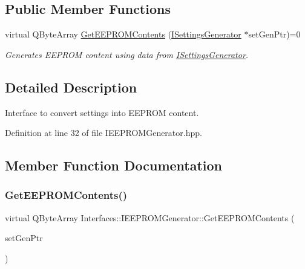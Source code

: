 \subsection*{Public Member Functions}
\begin{DoxyCompactItemize}
\item 
virtual Q\+Byte\+Array \hyperlink{class_interfaces_1_1_i_e_e_p_r_o_m_generator_a9d248220e0f557cf6c6b450ed84281dd}{Get\+E\+E\+P\+R\+O\+M\+Contents} (\hyperlink{class_interfaces_1_1_i_settings_generator}{I\+Settings\+Generator} $\ast$set\+Gen\+Ptr)=0
\begin{DoxyCompactList}\small\item\em Generates E\+E\+P\+R\+OM content using data from \hyperlink{class_interfaces_1_1_i_settings_generator}{I\+Settings\+Generator}. \end{DoxyCompactList}\end{DoxyCompactItemize}


\subsection{Detailed Description}
Interface to convert settings into E\+E\+P\+R\+OM content. 

Definition at line 32 of file I\+E\+E\+P\+R\+O\+M\+Generator.\+hpp.



\subsection{Member Function Documentation}
\mbox{\label{class_interfaces_1_1_i_e_e_p_r_o_m_generator_a9d248220e0f557cf6c6b450ed84281dd}} 
\subsubsection{\texorpdfstring{Get\+E\+E\+P\+R\+O\+M\+Contents()}{GetEEPROMContents()}}
{\footnotesize\ttfamily virtual Q\+Byte\+Array Interfaces\+::\+I\+E\+E\+P\+R\+O\+M\+Generator\+::\+Get\+E\+E\+P\+R\+O\+M\+Contents (\begin{DoxyParamCaption}\item[{\hyperlink{class_interfaces_1_1_i_settings_generator}{I\+Settings\+Generator} $\ast$}]{set\+Gen\+Ptr }\end{DoxyParamCaption})\hspace{0.3cm}{\ttfamily [pure virtual]}}



